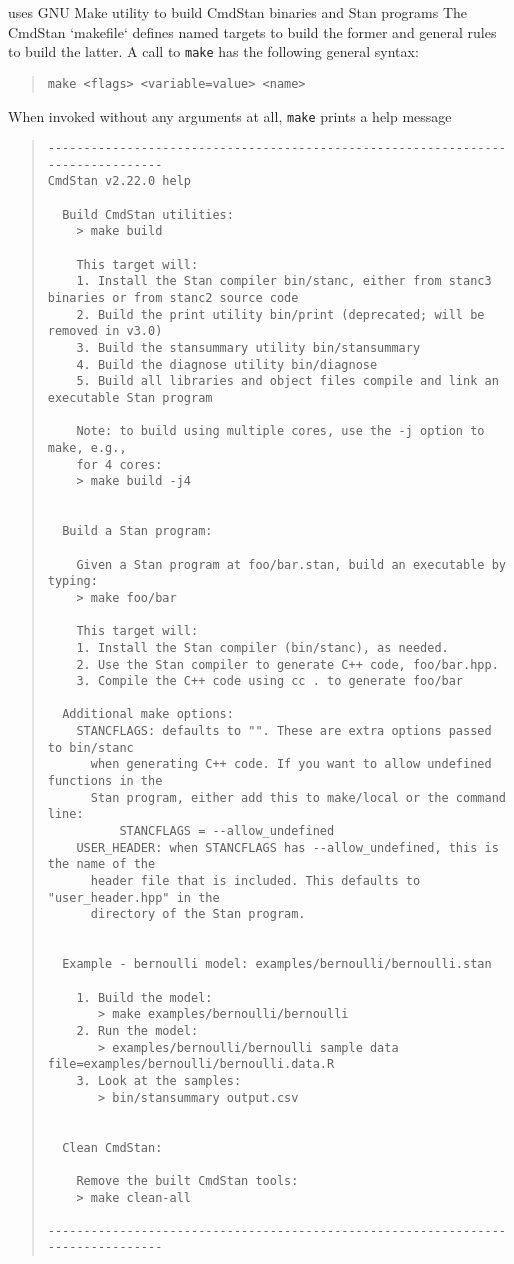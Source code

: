 \CmdStan uses GNU Make utility to build CmdStan binaries and Stan programs
The CmdStan `makefile` defines named targets to build the former and
general rules to build the latter.
A call to {\tt make} has the following general syntax:
%
\begin{quote}
\begin{Verbatim}[fontshape=sl]
make <flags> <variable=value> <name>
\end{Verbatim}
\end{quote}
%
When invoked without any arguments at all, {\tt make} prints a help message
%
\begin{quote}
\begin{Verbatim}[fontshape=sl]
--------------------------------------------------------------------------------
CmdStan v2.22.0 help

  Build CmdStan utilities:
    > make build

    This target will:
    1. Install the Stan compiler bin/stanc, either from stanc3 binaries or from stanc2 source code
    2. Build the print utility bin/print (deprecated; will be removed in v3.0)
    3. Build the stansummary utility bin/stansummary
    4. Build the diagnose utility bin/diagnose
    5. Build all libraries and object files compile and link an executable Stan program

    Note: to build using multiple cores, use the -j option to make, e.g., 
    for 4 cores:
    > make build -j4


  Build a Stan program:

    Given a Stan program at foo/bar.stan, build an executable by typing:
    > make foo/bar

    This target will:
    1. Install the Stan compiler (bin/stanc), as needed.
    2. Use the Stan compiler to generate C++ code, foo/bar.hpp.
    3. Compile the C++ code using cc . to generate foo/bar

  Additional make options:
    STANCFLAGS: defaults to "". These are extra options passed to bin/stanc
      when generating C++ code. If you want to allow undefined functions in the
      Stan program, either add this to make/local or the command line:
          STANCFLAGS = --allow_undefined
    USER_HEADER: when STANCFLAGS has --allow_undefined, this is the name of the
      header file that is included. This defaults to "user_header.hpp" in the
      directory of the Stan program.


  Example - bernoulli model: examples/bernoulli/bernoulli.stan

    1. Build the model:
       > make examples/bernoulli/bernoulli
    2. Run the model:
       > examples/bernoulli/bernoulli sample data file=examples/bernoulli/bernoulli.data.R
    3. Look at the samples:
       > bin/stansummary output.csv


  Clean CmdStan:

    Remove the built CmdStan tools:
    > make clean-all

--------------------------------------------------------------------------------
\end{Verbatim}
\end{quote}
%





